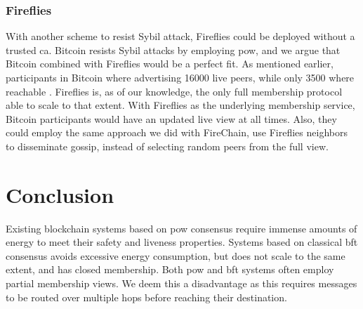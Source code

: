 \documentclass[USenglish]{uit-thesis}
\begin{document}
\subsection{Fireflies}

With another scheme to resist Sybil attack, Fireflies could be deployed without a trusted \gls{ca}.
Bitcoin resists Sybil attacks by employing \gls{pow}, and we argue that Bitcoin combined with Fireflies would be a perfect fit.
As mentioned earlier, participants in Bitcoin where advertising 16000 live peers, while only 3500 where reachable \cite{propa}.
Fireflies is, as of our knowledge, the only full membership protocol able to scale to that extent.
With Fireflies as the underlying membership service, Bitcoin participants would have an updated live view at all times.
Also, they could employ the same approach we did with FireChain, use Fireflies neighbors to disseminate gossip, instead of selecting random peers from the full view.


 



\fi

\chapter{Conclusion}\label{chap:conclusion}

Existing blockchain systems based on \acrfull{pow} consensus require immense amounts of energy to meet their safety and liveness properties.  
Systems based on classical \acrfull{bft} consensus avoids excessive energy consumption, but does not scale to the same extent, and has closed membership.
Both \gls{pow} and \gls{bft} systems often employ partial membership views.
We deem this a disadvantage as this requires messages to be routed over multiple hops before reaching their destination.
\end{document}
